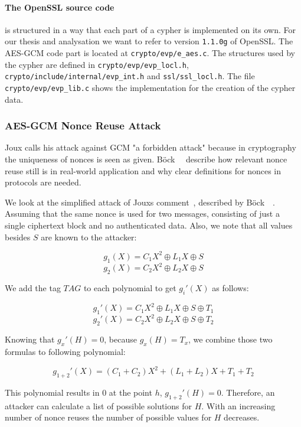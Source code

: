 \paragraph{The OpenSSL source code} is structured in a way that each part of a
cypher is implemented on its own. For our thesis and analysation we want to
refer to version \texttt{1.1.0g} of OpenSSL\cite{opensslsource}. The AES-GCM
code part is located at \texttt{crypto/evp/e\_aes.c}. The structures used by the
cypher are defined in \texttt{crypto/evp/evp\_locl.h},
\texttt{crypto/include/internal/evp\_int.h} and \texttt{ssl/ssl\_locl.h}. The
file \texttt{crypto/evp/evp\_lib.c} shows the implementation for the creation of
the cypher data.

\subsubsection{AES-GCM Nonce Reuse Attack}

Joux\cite{NISTGCMcomment} calls his attack against GCM "a forbidden attack"
because in cryptography the uniqueness of nonces is seen as given.
Böck~\etal~\cite{gcmnonceattack} describe how relevant nonce reuse still is in
real-world application and why clear definitions for nonces in protocols are
needed.

We look at the simplified attack of Joux\textquotesingle s
comment~\cite{NISTGCMcomment}, described by Böck~\etal~\cite{gcmnonceattack}.
Assuming that the same nonce is used for two messages, consisting of just a
single ciphertext block and no authenticated data. Also,  we note that all
values besides $S$ are known to the attacker:

\[g_1(X) = C{_{1}X^2 \oplus L_1X \oplus S}\]
\[g_2(X) = C{_{2}X^2 \oplus L_2X \oplus S}\]

We add the tag $TAG$ to each polynomial to get $g_i'(X)$ as follows:

\[g_1'(X) = C{_{1}X^2 \oplus L_1X \oplus S \oplus T_1}\]
\[g_2'(X) = C{_{2}X^2 \oplus L_2X \oplus S \oplus T_2}\]

Knowing that $g_x'(H) = 0$, because $g_x(H) = T_x$, we combine those two
formulas to following polynomial:

\[g_{1+2}'(X) = (C_{1} + C_{2})X^2 + (L_1 + L_2)X + T_1 + T_2\]

This polynomial results in $0$ at the point $h$, $g_{1+2}'(H) = 0$.
Therefore, an attacker can calculate a list of possible solutions for $H$.
With an increasing number of nonce reuses the number of possible values for $H$
decreases.


